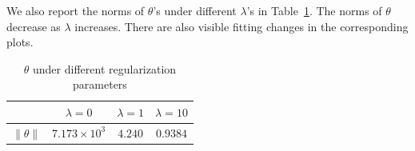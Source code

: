 \documentclass[10pt,a4paper]{article}
\begin{document}
  We also report the norms of $\theta$'s under different $\lambda$'s in Table~\ref{tab:norm}. The norms of $\theta$ decrease as $\lambda$ increases. There are also visible fitting changes in the corresponding plots.


    \begin{table}[htb]
    \caption{$\theta$ under different regularization parameters}
    \begin{center}
     \begin{tabular}{|c|c|c|c|} \hline
                    & $\lambda=0$ & $\lambda=1$ & $\lambda=10$ \\ \hline
       $\|\theta\|$ & $7.173\times 10^3$ & $4.240$ & $0.9384$ \\ \hline
     \end{tabular}
    \end{center}
    \label{tab:norm}
    \end{table}
\end{document}
